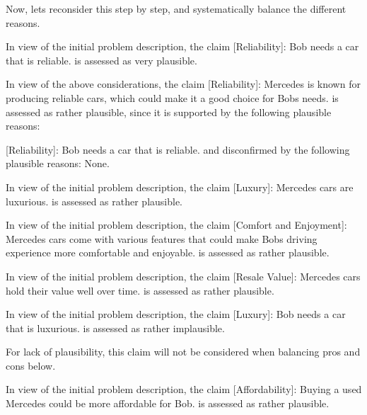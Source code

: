 \documentclass[
  letterpaper,
  DIV=11,
  numbers=noendperiod]{scrartcl}
\newenvironment{Shaded}{\begin{snugshade}}{\end{snugshade}}
\newcommand{\CommentTok}[1]{\textcolor[rgb]{0.37,0.37,0.37}{#1}}
\newcommand{\NormalTok}[1]{\textcolor[rgb]{0.00,0.23,0.31}{#1}}
\newcommand{\OtherTok}[1]{\textcolor[rgb]{0.00,0.23,0.31}{#1}}
\begin{document}
\begin{Shaded}
\begin{Highlighting}[]
\NormalTok{Now, let\textquotesingle{}s reconsider this step by step, and systematically balance the different reasons.}

\NormalTok{In view of the initial problem description, the claim \textquotesingle{}}\CommentTok{[}\OtherTok{Reliability}\CommentTok{]}\NormalTok{: Bob needs a car that is reliable.\textquotesingle{} is assessed as very plausible.}

\NormalTok{In view of the above considerations, the claim \textquotesingle{}}\CommentTok{[}\OtherTok{Reliability}\CommentTok{]}\NormalTok{: Mercedes is known for producing reliable cars, which could make it a good choice for Bob\textquotesingle{}s needs.\textquotesingle{} is assessed as rather plausible, since it is supported by the following plausible reasons:}

\OtherTok{[Reliability]: }\NormalTok{Bob needs a car that is reliable.}
\NormalTok{and disconfirmed by the following plausible reasons:}
\NormalTok{None.}

\NormalTok{In view of the initial problem description, the claim \textquotesingle{}}\CommentTok{[}\OtherTok{Luxury}\CommentTok{]}\NormalTok{: Mercedes cars are luxurious.\textquotesingle{} is assessed as rather plausible.}

\NormalTok{In view of the initial problem description, the claim \textquotesingle{}}\CommentTok{[}\OtherTok{Comfort and Enjoyment}\CommentTok{]}\NormalTok{: Mercedes cars come with various features that could make Bob\textquotesingle{}s driving experience more comfortable and enjoyable.\textquotesingle{} is assessed as rather plausible.}

\NormalTok{In view of the initial problem description, the claim \textquotesingle{}}\CommentTok{[}\OtherTok{Resale Value}\CommentTok{]}\NormalTok{: Mercedes cars hold their value well over time.\textquotesingle{} is assessed as rather plausible.}

\NormalTok{In view of the initial problem description, the claim \textquotesingle{}}\CommentTok{[}\OtherTok{Luxury}\CommentTok{]}\NormalTok{: Bob needs a car that is luxurious.\textquotesingle{} is assessed as rather implausible.}

\NormalTok{For lack of plausibility, this claim will not be considered when balancing pros and cons below.}

\NormalTok{In view of the initial problem description, the claim \textquotesingle{}}\CommentTok{[}\OtherTok{Affordability}\CommentTok{]}\NormalTok{: Buying a used Mercedes could be more affordable for Bob.\textquotesingle{} is assessed as rather plausible.}


\end{Highlighting}
\end{Shaded}
\end{document}
